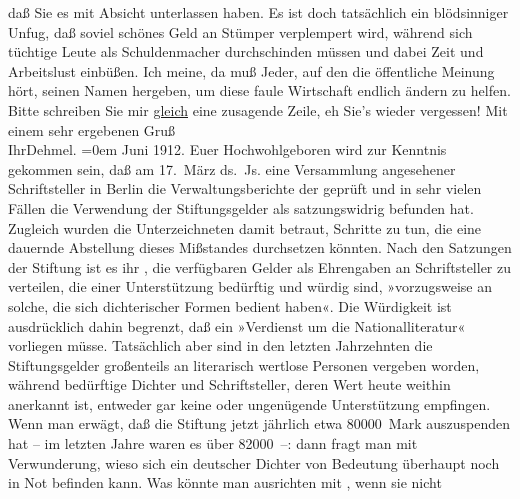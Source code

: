 \begin{ledgroupsized}[t]{13cm}
               daß Sie es mit Absicht unterlassen haben. Es ist doch tatsächlich ein blödsinniger
               Unfug, daß soviel schönes Geld an Stümper verplempert wird, während sich tüchtige
               Leute als Schuldenmacher durchschinden müssen und dabei Zeit und Arbeitslust
               einbüßen. Ich meine, da muß Jeder, auf den die öffentliche Meinung hört, seinen Namen
               hergeben, um diese faule Wirtschaft endlich ändern zu helfen. Bitte schreiben Sie mir
                  \uline{gleich} eine zusagende Zeile, eh Sie’s wieder
               vergessen! \pend
           \pstart
           Mit einem sehr ergebenen Gruß{\\[\baselineskip]}Ihr\spacefill\mbox{Dehmel.}\pend
           \leftskip=0em{}{\bigskip}\pstart
           \raggedleft{}{\pb}Juni 1912.\pend
           \pstart{}Euer Hochwohlgeboren\pend\pstart
           wird zur Kenntnis gekommen sein, daß am 17. März ds. Js. eine
               Versammlung angesehener Schriftsteller in Berlin
               die Verwaltungsberichte der  geprüft und in sehr vielen Fällen die Verwendung der Stiftungsgelder als
               satzungswidrig befunden hat. Zugleich wurden die Unterzeichneten damit betraut,
               Schritte zu tun, die eine dauernde Abstellung dieses Mißstandes durchsetzen
               könnten.\pend
           \pstart
           Nach den Satzungen der Stiftung ist es ihr , die
               verfügbaren Gelder als Ehrengaben an Schriftsteller zu verteilen, die einer
               Unterstützung bedürftig und würdig sind, »vorzugsweise an solche, die sich
               dichterischer Formen bedient haben«. Die Würdigkeit ist ausdrücklich dahin begrenzt,
               daß ein »Verdienst um die Nationalliteratur« vorliegen müsse. Tatsächlich aber sind
               in den letzten Jahrzehnten die Stiftungsgelder großenteils an literarisch wertlose
               Personen vergeben worden, während bedürftige Dichter und Schriftsteller, deren Wert
               heute weithin anerkannt ist, entweder gar keine oder ungenügende Unterstützung
               empfingen.\pend
           \pstart
           Wenn man erwägt, daß die Stiftung jetzt jährlich etwa 80000 Mark auszuspenden hat –
               im letzten Jahre waren es über 82000 –: dann fragt man mit Verwunderung, wieso sich
               ein deutscher Dichter von Bedeutung überhaupt noch in Not befinden kann. Was könnte
               man ausrichten mit , wenn sie nicht

\end{ledgroupsized}
